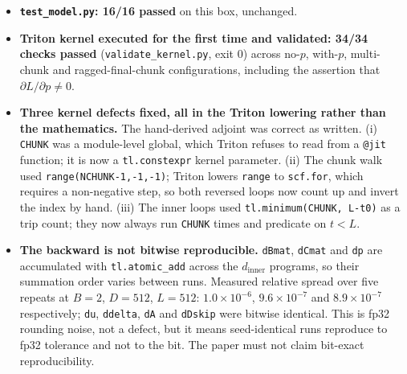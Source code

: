 \documentclass[11pt,a4paper]{article}
\newcommand{\code}[1]{\texttt{\small #1}}
\newcommand{\warn}[1]{\textcolor{warncol}{\textbf{#1}}}
\begin{document}
\begin{itemize}
byte per line in each case; and (iii) the md5 of the two \code{.npz} files,
whose byte sizes are nevertheless \emph{identical}, because a zip central
directory records the creating platform---\code{create\_system} is 3 (Unix)
here and 0 (Windows) there. The md5s of the three files downloaded from 4DN,
which are the ones checked against the 4DN API, are unchanged. Band contents
re-verified directly: 7{,}108{,}483 entries, 0 non-finite, min
$4.25\times10^{-6}$ / median $3.10\times10^{-4}$ / max 0.942, 27{,}679 bins,
5{,}345 (19.31\%) without a balancing weight---every figure matching
\code{docs/data\_card.md} \S4. Whether to commit the Linux manifest is a
judgement call left to the PI; a manifest whose md5s are platform-dependent
cannot serve as a cross-platform integrity check for the derived files, only
for the downloaded ones.
\item \textbf{\code{test\_model.py}: 16/16 passed} on this box, unchanged.
\item \textbf{Triton kernel executed for the first time and validated:
34/34 checks passed} (\code{validate\_kernel.py}, exit 0) across no-$p$,
with-$p$, multi-chunk and ragged-final-chunk configurations, including the
assertion that $\partial L/\partial p \neq 0$.
\item \textbf{Three kernel defects fixed, all in the Triton lowering rather
than the mathematics.} The hand-derived adjoint was correct as written.
(i) \code{CHUNK} was a module-level global, which Triton refuses to read from
a \code{@jit} function; it is now a \code{tl.constexpr} kernel parameter.
(ii) The chunk walk used \code{range(NCHUNK-1,-1,-1)}; Triton lowers
\code{range} to \code{scf.for}, which requires a non-negative step, so both
reversed loops now count up and invert the index by hand.
(iii) The inner loops used \code{tl.minimum(CHUNK, L-t0)} as a trip count;
they now always run \code{CHUNK} times and predicate on $t<L$.
\item \warn{The backward is not bitwise reproducible.} \code{dBmat},
\code{dCmat} and \code{dp} are accumulated with \code{tl.atomic\_add} across
the $d_{\text{inner}}$ programs, so their summation order varies between runs.
Measured relative spread over five repeats at $B=2$, $D=512$, $L=512$:
$1.0\times10^{-6}$, $9.6\times10^{-7}$ and $8.9\times10^{-7}$ respectively;
\code{du}, \code{ddelta}, \code{dA} and \code{dDskip} were bitwise identical.
This is fp32 rounding noise, not a defect, but it means seed-identical runs
reproduce to fp32 tolerance and not to the bit. The paper must not claim
bit-exact reproducibility.

\end{itemize}
\end{document}
